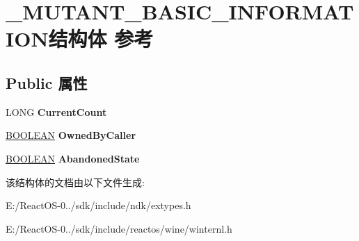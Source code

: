 \hypertarget{struct___m_u_t_a_n_t___b_a_s_i_c___i_n_f_o_r_m_a_t_i_o_n}{}\section{\+\_\+\+M\+U\+T\+A\+N\+T\+\_\+\+B\+A\+S\+I\+C\+\_\+\+I\+N\+F\+O\+R\+M\+A\+T\+I\+O\+N结构体 参考}
\label{struct___m_u_t_a_n_t___b_a_s_i_c___i_n_f_o_r_m_a_t_i_o_n}
\subsection*{Public 属性}
\begin{DoxyCompactItemize}
\item 
\mbox{\label{struct___m_u_t_a_n_t___b_a_s_i_c___i_n_f_o_r_m_a_t_i_o_n_a8f04ca802b03a268d42f34a5ac9016a0}} 
L\+O\+NG {\bfseries Current\+Count}
\item 
\mbox{\label{struct___m_u_t_a_n_t___b_a_s_i_c___i_n_f_o_r_m_a_t_i_o_n_aad8e4dd1d11b86c61816cead92f2a6af}} 
\hyperlink{_processor_bind_8h_a112e3146cb38b6ee95e64d85842e380a}{B\+O\+O\+L\+E\+AN} {\bfseries Owned\+By\+Caller}
\item 
\mbox{\label{struct___m_u_t_a_n_t___b_a_s_i_c___i_n_f_o_r_m_a_t_i_o_n_a835b3a308ba06ab9b1d550103cc6a870}} 
\hyperlink{_processor_bind_8h_a112e3146cb38b6ee95e64d85842e380a}{B\+O\+O\+L\+E\+AN} {\bfseries Abandoned\+State}
\end{DoxyCompactItemize}


该结构体的文档由以下文件生成\+:\begin{DoxyCompactItemize}
\item 
E\+:/\+React\+O\+S-\/0../sdk/include/ndk/extypes.\+h\item 
E\+:/\+React\+O\+S-\/0../sdk/include/reactos/wine/winternl.\+h\end{DoxyCompactItemize}
